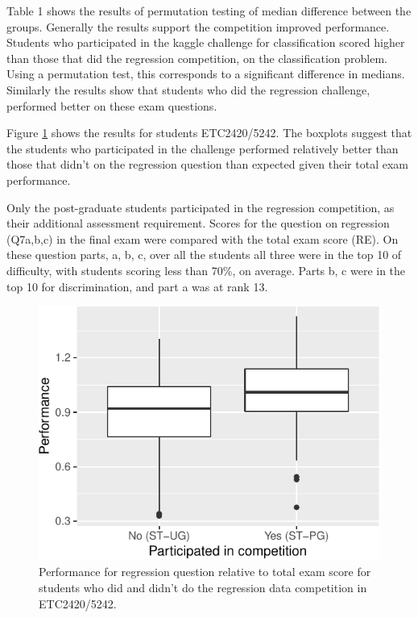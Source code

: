 \documentclass[12pt]{article}
\begin{document}
Table 1 shows the results of permutation testing of median difference
between the groups. Generally the results support the competition
improved performance. Students who participated in the kaggle challenge
for classification scored higher than those that did the regression
competition, on the classification problem. Using a permutation test,
this corresponds to a significant difference in medians. Similarly the
results show that students who did the regression challenge, performed
better on these exam questions.

Figure \ref{fig:ETC5242} shows the results for students ETC2420/5242.
The boxplots suggest that the students who participated in the challenge
performed relatively better than those that didn't on the regression
question than expected given their total exam performance.

Only the post-graduate students participated in the regression
competition, as their additional assessment requirement. Scores for the
question on regression (Q7a,b,c) in the final exam were compared with
the total exam score (RE). On these question parts, a, b, c, over all
the students all three were in the top 10 of difficulty, with students
scoring less than 70\%, on average. Parts b, c were in the top 10 for
discrimination, and part a was at rank 13.

\begin{figure}
\centering
\includegraphics{paper-kaggle_files/figure-latex/ETC5242-1.pdf}
\caption{\label{fig:ETC5242} Performance for regression question
relative to total exam score for students who did and didn't do the
regression data competition in ETC2420/5242.}
\end{figure}
\end{document}

